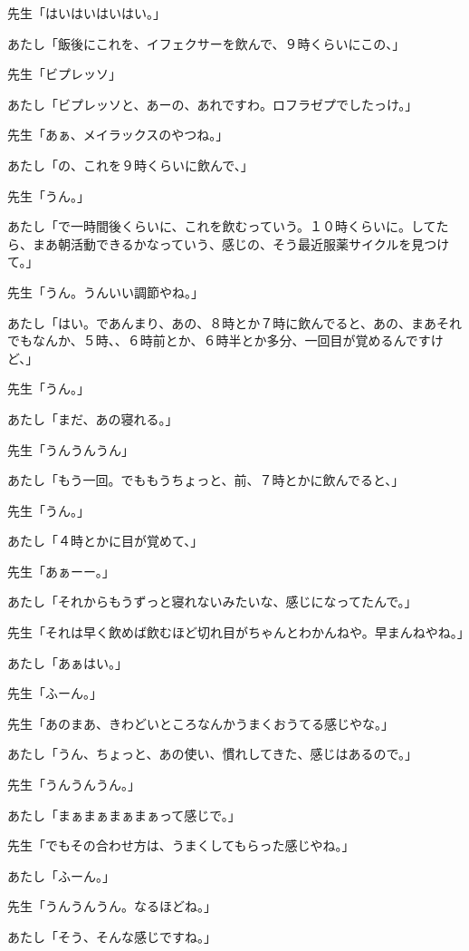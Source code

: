 \documentclass[b5j,twoside,twocolumn]{utarticle}
\begin{document}
\begin{description}
\item 先生「はいはいはいはい。」
\item あたし「飯後にこれを、イフェクサーを飲んで、９時くらいにこの、」
\item 先生「ビプレッソ」
\item あたし「ビプレッソと、あーの、あれですわ。ロフラゼプでしたっけ。」
\item 先生「あぁ、メイラックスのやつね。」
\item あたし「の、これを９時くらいに飲んで、」
\item 先生「うん。」
\item あたし「で一時間後くらいに、これを飲むっていう。１０時くらいに。してたら、まあ朝活動できるかなっていう、感じの、そう最近服薬サイクルを見つけて。」
\item 先生「うん。うんいい調節やね。」
\item あたし「はい。であんまり、あの、８時とか７時に飲んでると、あの、まあそれでもなんか、５時、、６時前とか、６時半とか多分、一回目が覚めるんですけど、」
\item 先生「うん。」
\item あたし「まだ、あの寝れる。」
\item 先生「うんうんうん」
\item あたし「もう一回。でももうちょっと、前、７時とかに飲んでると、」
\item 先生「うん。」
\item あたし「４時とかに目が覚めて、」
\item 先生「あぁーー。」
\item あたし「それからもうずっと寝れないみたいな、感じになってたんで。」
\item 先生「それは早く飲めば飲むほど切れ目がちゃんとわかんねや。早まんねやね。」
\item あたし「あぁはい。」
\item 先生「ふーん。」
\item 先生「あのまあ、きわどいところなんかうまくおうてる感じやな。」
\item あたし「うん、ちょっと、あの使い、慣れしてきた、感じはあるので。」
\item 先生「うんうんうん。」
\item あたし「まぁまぁまぁまぁって感じで。」
\item 先生「でもその合わせ方は、うまくしてもらった感じやね。」
\item あたし「ふーん。」
\item 先生「うんうんうん。なるほどね。」
\item あたし「そう、そんな感じですね。」

\end{description}
\end{document}
